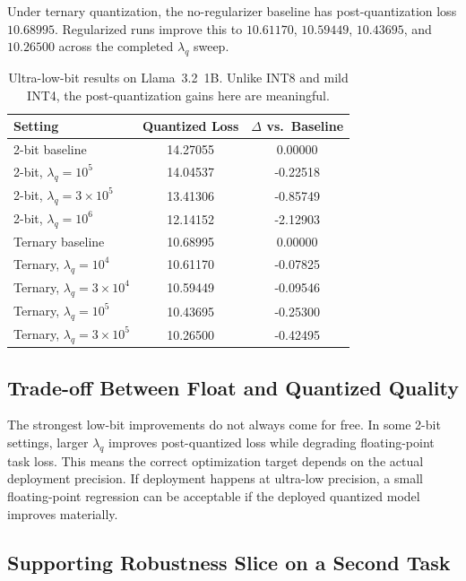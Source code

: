 \documentclass[11pt]{article}
\begin{document}
Under ternary quantization, the no-regularizer baseline has post-quantization loss $10.68995$. Regularized runs improve this to $10.61170$, $10.59449$, $10.43695$, and $10.26500$ across the completed $\lambda_q$ sweep.

\begin{table}[t]
\centering
\small
\begin{tabular}{lcc}
\toprule
Setting & Quantized Loss & $\Delta$ vs.\ Baseline \\
\midrule
2-bit baseline & 14.27055 & 0.00000 \\
2-bit, $\lambda_q=10^5$ & 14.04537 & -0.22518 \\
2-bit, $\lambda_q=3 \times 10^5$ & 13.41306 & -0.85749 \\
2-bit, $\lambda_q=10^6$ & 12.14152 & -2.12903 \\
\midrule
Ternary baseline & 10.68995 & 0.00000 \\
Ternary, $\lambda_q=10^4$ & 10.61170 & -0.07825 \\
Ternary, $\lambda_q=3 \times 10^4$ & 10.59449 & -0.09546 \\
Ternary, $\lambda_q=10^5$ & 10.43695 & -0.25300 \\
Ternary, $\lambda_q=3 \times 10^5$ & 10.26500 & -0.42495 \\
\bottomrule
\end{tabular}
\caption{Ultra-low-bit results on Llama~3.2~1B. Unlike INT8 and mild INT4, the post-quantization gains here are meaningful.}
\label{tab:lowbit}
\end{table}

\subsection{Trade-off Between Float and Quantized Quality}

The strongest low-bit improvements do not always come for free. In some 2-bit settings, larger $\lambda_q$ improves post-quantized loss while degrading floating-point task loss. This means the correct optimization target depends on the actual deployment precision. If deployment happens at ultra-low precision, a small floating-point regression can be acceptable if the deployed quantized model improves materially.

\subsection{Supporting Robustness Slice on a Second Task}
\end{document}
